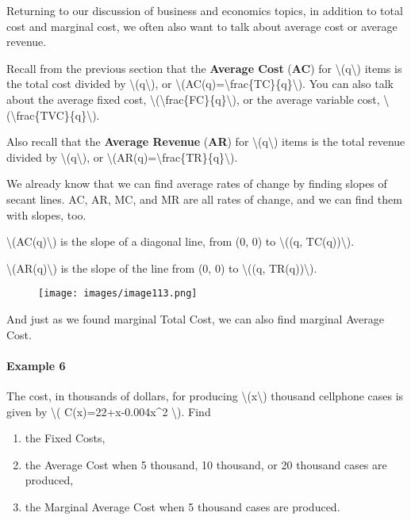 Returning to our discussion of business and economics topics, in
addition to total cost and marginal cost, we often also want to talk
about average cost or average revenue.

Recall from the previous section that the \textbf{Average Cost}
(\textbf{AC}) for \textbackslash{}(q\textbackslash{}) items is the total
cost divided by \textbackslash{}(q\textbackslash{}), or
\textbackslash{}(AC(q)=\textbackslash{}frac\{TC\}\{q\}\textbackslash{}).
You can also talk about the average fixed cost,
\textbackslash{}(\textbackslash{}frac\{FC\}\{q\}\textbackslash{}), or
the average variable cost,
\textbackslash{}(\textbackslash{}frac\{TVC\}\{q\}\textbackslash{}).

Also recall that the \textbf{Average Revenue} (\textbf{AR}) for
\textbackslash{}(q\textbackslash{}) items is the total revenue divided
by \textbackslash{}(q\textbackslash{}), or
\textbackslash{}(AR(q)=\textbackslash{}frac\{TR\}\{q\}\textbackslash{}).

We already know that we can find average rates of change by finding
slopes of secant lines. AC, AR, MC, and MR are all rates of change, and
we can find them with slopes, too.

\textbackslash{}(AC(q)\textbackslash{}) is the slope of a diagonal line,
from (0, 0) to \textbackslash{}((q, TC(q))\textbackslash{}).

\textbackslash{}(AR(q)\textbackslash{}) is the slope of the line from
(0, 0) to \textbackslash{}((q, TR(q))\textbackslash{}).

\begin{figure}
\centering
\texttt{[image: images/image113.png]}
\caption{}
\end{figure}

And just as we found marginal Total Cost, we can also find marginal
Average Cost.

\hypertarget{example-6}{%
\paragraph{Example 6}\label{example-6}}

The cost, in thousands of dollars, for producing
\textbackslash{}(x\textbackslash{}) thousand cellphone cases is given by
\textbackslash{}( C(x)=22+x-0.004x\^{}2 \textbackslash{}). Find

\begin{enumerate}
\tightlist
\item
  the Fixed Costs,
\item
  the Average Cost when 5 thousand, 10 thousand, or 20 thousand cases
  are produced,
\item
  the Marginal Average Cost when 5 thousand cases are produced.
\end{enumerate}

